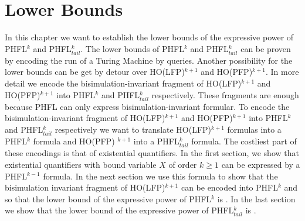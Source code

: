 
\chapter{Lower Bounds}\label{ch:lowerBounds}

In this chapter we want to establish the lower bounds of the expressive power of PHFL$^k$ and PHFL$^k_{tail}$. The
lower bounds of PHFL$^k$ and PHFL$^k_{tail}$ can be proven by encoding the run of a Turing Machine by queries.
Another possibility for the lower bounds can be get by detour over HO(LFP)$^{k+1}$ and HO(PFP)$^{k+1}$. In more detail
we encode the bisimulation-invariant fragment of HO(LFP)$^{k+1}$ and HO(PFP)$^{k+1}$ into PHFL$^k$ and
PHFL$^k_{tail}$ respectively. These fragments are enough because PHFL can only express bisimulation-invariant
formular. To encode the bisimulation-invariant fragment of HO(LFP)$^{k+1}$ and HO(PFP)$^{k+1}$ into PHFL$^k$ and
PHFL$^{k}_{tail}$ respectively we want to translate HO(LFP)$^{k+1}$ formulas into a PHFL$^k$ formula and HO(PFP)
$^{k+1}$ into a PHFL$^k_{tail}$ formula. The costliest part of these encodings is that of existential quantifiers. In
the first section, we show that existential quantifiers with bound variable $X$ of order $k \geq 1$ can be expressed
by a PHFL$^{k-1}$ formula. In the next section we use this formula to show that the bisimulation invariant fragment
of HO(LFP)$^{k+1}$ can be encoded into PHFL$^k$ and so that the lower bound of the expressive power of PHFL$^k$ is
. In the last section we show that the lower bound of the expressive power of PHFL$^k_{tail}$ is
.






